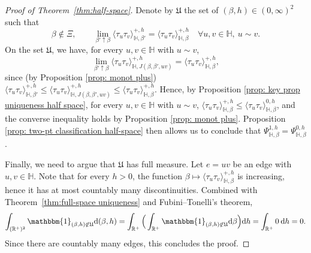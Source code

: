 \documentclass[11pt,a4paper]{article}
\numberwithin{equation}{section}
\theoremstyle{plain}
\theoremstyle{definition}
\begin{document}
\begin{proof}[Proof of Theorem~\textup{\ref{thm:half-space}}]
Denote by $\mathfrak{U}$ the set of $(\beta,h)\in (0,\infty)^2$ such that 
\begin{equation}
\beta\notin \Xi, \qquad 
\lim_{\beta'\uparrow \beta}\langle \tau_u \tau_v\rangle^{+,h}_{\mathbb{H},\beta'}=\langle \tau_u \tau_v\rangle^{+,h}_{\mathbb{H},\beta} \quad \forall u,v\in \mathbb H, \: u\sim v.
\end{equation}
On the set $\mathfrak U$, we have, for every $u,v\in \mathbb H$ with $u\sim v$, 
\begin{equation}
\lim_{\beta'\uparrow \beta}\langle \tau_u \tau_v \rangle^{+,h}_{\mathbb{H},J(\beta,\beta',uv)}=\langle \tau_u \tau_v\rangle^{+,h}_{\mathbb{H},\beta},
\end{equation}
since (by Proposition \ref{prop: monot plus}) $\langle \tau_u \tau_v \rangle^{+,h}_{\mathbb{H},\beta'}\leq \langle \tau_u \tau_v \rangle^{+,h}_{\mathbb{H},J(\beta,\beta',uv)}\leq \langle \tau_u \tau_v \rangle^{+,h}_{\mathbb{H},\beta}$. Hence, by Proposition \ref{prop: key prop uniqueness half space}, for every $u,v\in \mathbb H$ with $u\sim v$, $\langle \tau_u \tau_v \rangle^{+,h}_{\mathbb{H},\beta}\leq \langle \tau_u \tau_v \rangle^{0,h}_{\mathbb{H},\beta}$, and the converse inequality holds by Proposition \ref{prop: monot plus}. Proposition \ref{prop: two-pt classification half-space} then allows us to conclude that $\Psi^{1,h}_{\mathbb{H},\beta}=\Psi^{0,h}_{\mathbb{H}, \beta}$.

Finally, we need to argue that $\mathfrak U$ has full measure. Let $e=uv$ be an edge with $u,v\in \mathbb{H}$. Note that for every $h>0$, the function $\beta\mapsto \langle \tau_u \tau_v\rangle^{+,h}_{\mathbb{H},\beta}$ is increasing, hence it has at most countably many discontinuities. Combined with Theorem~\ref{thm:full-space uniqueness} and Fubini--Tonelli's theorem,
\begin{equation}
\int_{(\mathbb{R}^+)^2} \mathbbm{1}_{(\beta,h)\not\in \mathfrak{U}}\mathrm{d}(\beta,h)=\int_{\mathbb{R}^+}\Big(\int_{\mathbb{R}^+} \mathbbm{1}_{(\beta,h)\not\in \mathfrak{U}}\mathrm{d}\beta\Big)\mathrm{d}h=\int_{\mathbb R^+} 0\:\mathrm{d}h=0.
\end{equation}   
Since there are countably many edges, this concludes the proof. 
\end{proof}
\end{document}
